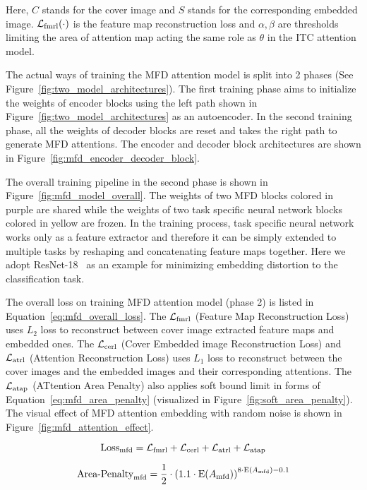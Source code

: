 Here, \(C\) stands for the cover image and \(S\) stands for the corresponding embedded image. \(\mathcal{L}_\mathrm{fmrl}(\cdot)\) is the feature map reconstruction loss and \( \alpha, \beta \) are thresholds limiting the area of attention map acting the same role as \( \theta \) in the ITC attention model.

\figureTwoModelArchitectures%

\figureMFDModelOverall%
 
\figureMfdEncoderDecoderBlock%

The actual ways of training the MFD attention model is split into 2 phases (See Figure~\ref{fig:two_model_architectures}). The first training phase aims to initialize the weights of encoder blocks using the left path shown in Figure~\ref{fig:two_model_architectures} as an autoencoder. In the second training phase, all the weights of decoder blocks are reset and takes the right path to generate MFD attentions. The encoder and decoder block architectures are shown in Figure~\ref{fig:mfd_encoder_decoder_block}.

The overall training pipeline in the second phase is shown in Figure~\ref{fig:mfd_model_overall}. The weights of two MFD blocks colored in purple are shared while the weights of two task specific neural network blocks colored in yellow are frozen. In the training process, task specific neural network works only as a feature extractor and therefore it can be simply extended to multiple tasks by reshaping and concatenating feature maps together. Here we adopt ResNet-18~\cite{ResNet} as an example for minimizing embedding distortion to the classification task.

The overall loss on training MFD attention model (phase 2) is listed in Equation~\ref{eq:mfd_overall_loss}.
The \( \mathcal{L}_\mathrm{fmrl} \) (Feature Map Reconstruction Loss) uses \(L_2\) loss to reconstruct between cover image extracted feature maps and embedded ones. The \( \mathcal{L}_\mathrm{cerl} \) (Cover Embedded image Reconstruction Loss) and \( \mathcal{L}_\mathrm{atrl} \) (Attention Reconstruction Loss) uses \(L_1\) loss to reconstruct between the cover images and the embedded images and their corresponding attentions. The \( \mathcal{L}_\mathrm{atap} \) (ATtention Area Penalty) also applies soft bound limit in forms of Equation~\ref{eq:mfd_area_penalty} (visualized in Figure~\ref{fig:soft_area_penalty}). The visual effect of MFD attention embedding with random noise is shown in Figure~\ref{fig:mfd_attention_effect}.

\begin{equation}
  \mathrm{Loss}_{\text{mfd}} = \mathcal{L}_\mathrm{fmrl} + \mathcal{L}_\mathrm{cerl} + \mathcal{L}_\mathrm{atrl} + \mathcal{L}_\mathrm{atap}
  \label{eq:mfd_overall_loss}
\end{equation}

\begin{equation}
  \text{Area-Penalty}_{\text{mfd}} = \frac{1}{2} \cdot {(1.1 \cdot \mathrm{E}(A_{\text{mfd}}))}^{8 \cdot \mathrm{E}(A_{\text{mfd}}) - 0.1}
  \label{eq:mfd_area_penalty}
\end{equation}

\figureSoftAreaPenalty%

\figureMfdAttentionEffect%
